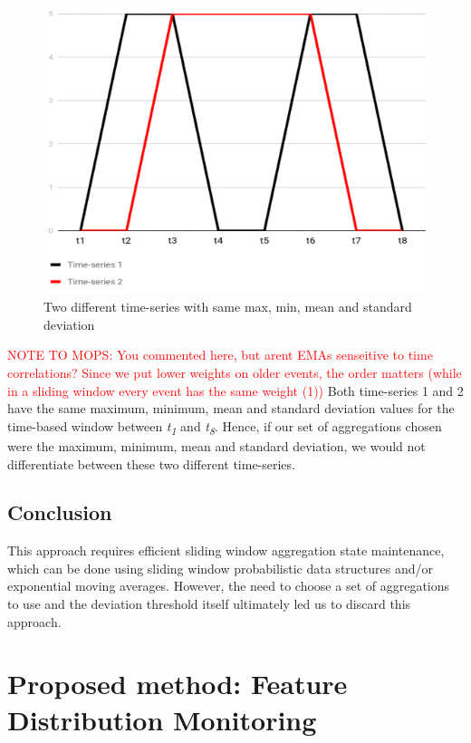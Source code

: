 \begin{figure}[!htb]
    \begin{center}
      \includegraphics[scale=0.7]{figures/approach2-timeseries.png}
      \caption[]{Two different time-series with same max, min, mean and standard deviation}
      \label{fig:approach2-timeseries}
    \end{center}
\end{figure}

\textcolor{red}{NOTE TO MOPS: You commented here, but arent EMAs senseitive to time correlations? Since we put lower weights on older events, the order matters (while in a sliding window every event has the same weight (1))}
Both time-series 1 and 2 have the same maximum, minimum, mean and standard deviation values for the time-based window between \textit{t\textsubscript{1}} and \textit{t\textsubscript{8}}. Hence, if our set of aggregations chosen were the maximum, minimum, mean and standard deviation, we would not differentiate between these two different time-series.

\subsection*{Conclusion}
This approach requires efficient sliding window aggregation state maintenance, which can be done using sliding window probabilistic data structures and/or exponential moving averages. However, the need to choose a set of aggregations to use and the deviation threshold itself ultimately led us to discard this approach.


\section{Proposed method: Feature Distribution Monitoring}

